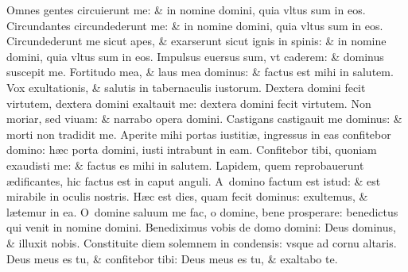 \documentclass[a5paper,10pt]{book}
\def\ae{æ}
\begin{document}
\begin{multicols*}{2}
\newline \color{red} O\color{black}mnes gentes circuierunt me: \& in nomine domini, quia vltus sum in eos.
\newline \color{red} C\color{black}ircundantes circundederunt me: \& in nomine domini, quia vltus sum in eos.
\newline \color{red} C\color{black}ircundederunt me sicut apes, \& exarserunt sicut ignis in spinis: \& in nomine domini, quia vltus sum in eos.
\newline \color{red} I\color{black}mpulsus euersus sum, vt caderem: \& dominus suscepit me.
\newline \color{red} F\color{black}ortitudo mea, \& laus mea dominus: \& factus est mihi in salutem.
\newline \color{red} V\color{black}ox exultationis, \& salutis in tabernaculis iustorum.
\newline \color{red} D\color{black}extera domini fecit virtutem, dextera domini exaltauit me: dextera domini fecit virtutem.
\newline \color{red} N\color{black}on moriar, sed viuam: \& narrabo opera domini.
\newline \color{red} C\color{black}astigans castigauit me dominus: \& morti non tradidit me.
\newline \color{red} A\color{black}perite mihi portas iustiti\ae , ingressus in eas confitebor domino: h\ae c porta domini, iusti intrabunt in eam.
\newline \color{red} C\color{black}onfitebor tibi, quoniam exaudisti me: \& factus es mihi in salutem.
\newline \color{red} L\color{black}apidem, quem reprobauerunt \ae dificantes, hic factus est in caput anguli.
\newline \color{red} A\color{black}\ domino factum est istud: \& est mirabile in oculis nostris.
\newline \color{red} H\color{black}\ae c est dies, quam fecit dominus: exultemus, \& l\ae temur in ea.
\newline \color{red} O\color{black}\ domine saluum me fac, o domine, bene prosperare: benedictus qui venit in nomine domini.
\newline \color{red} B\color{black}enediximus vobis de domo domini: Deus dominus, \& illuxit nobis.
\newline \color{red} C\color{black}onstituite diem solemnem in condensis: vsque ad cornu altaris.
\newline \color{red} D\color{black}eus meus es tu, \& confitebor tibi: Deus meus es tu, \& exaltabo te.

\end{multicols*}
\end{document}
